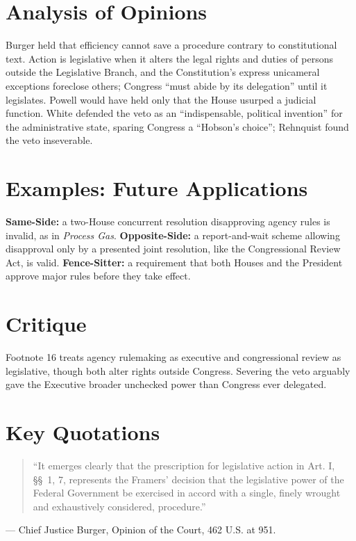 \documentclass[12pt]{article}
\begin{document}
\section{Analysis of Opinions}
Burger held that efficiency cannot save a procedure contrary to constitutional text. Action is legislative when it alters the legal rights and duties of persons outside the Legislative Branch, and the Constitution's express unicameral exceptions foreclose others; Congress ``must abide by its delegation'' until it legislates. Powell would have held only that the House usurped a judicial function. White defended the veto as an ``indispensable, political invention'' for the administrative state, sparing Congress a ``Hobson's choice''; Rehnquist found the veto inseverable.

\section{Examples: Future Applications}
\textbf{Same-Side:} a two-House concurrent resolution disapproving agency rules is invalid, as in \textit{Process Gas}. \textbf{Opposite-Side:} a report-and-wait scheme allowing disapproval only by a presented joint resolution, like the Congressional Review Act, is valid. \textbf{Fence-Sitter:} a requirement that both Houses and the President approve major rules before they take effect.

\section{Critique}
Footnote 16 treats agency rulemaking as executive and congressional review as legislative, though both alter rights outside Congress. Severing the veto arguably gave the Executive broader unchecked power than Congress ever delegated.

\section{Key Quotations}
\begin{quote}
``It emerges clearly that the prescription for legislative action in Art. I, \S\S~1, 7, represents the Framers' decision that the legislative power of the Federal Government be exercised in accord with a single, finely wrought and exhaustively considered, procedure.''
\end{quote}
\noindent --- Chief Justice Burger, Opinion of the Court, 462 U.S. at 951.
\end{document}
